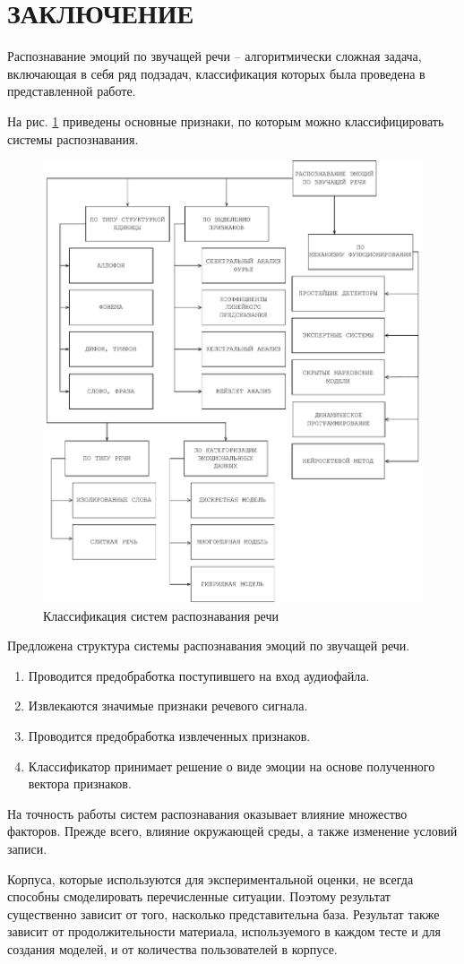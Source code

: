 \part*{ЗАКЛЮЧЕНИЕ}

Распознавание эмоций по звучащей речи -- алгоритмически сложная задача, включающая в себя ряд подзадач, классификация которых была проведена в представленной работе.

На рис. \ref{fig:classification} приведены основные признаки, по которым можно классифицировать системы распознавания.

\begin{figure}[H]
	\centering
	\includegraphics[width=0.85\linewidth]{assets/class}
	\caption{Классификация систем распознавания речи}
	\label{fig:classification}
\end{figure}


Предложена структура системы распознавания эмоций по звучащей речи. 
\begin{enumerate}
	\item Проводится предобработка поступившего на вход аудиофайла.
	\item Извлекаются значимые признаки речевого сигнала.
	\item Проводится предобработка извлеченных признаков. 
	\item Классификатор принимает решение о виде эмоции на основе полученного вектора признаков.
\end{enumerate}

На точность работы систем распознавания оказывает влияние множество факторов. Прежде всего, влияние окружающей среды, а также изменение условий записи.

Корпуса, которые используются для экспериментальной оценки, не всегда способны смоделировать перечисленные ситуации. Поэтому результат существенно зависит от того, насколько представительна база. Результат также зависит от продолжительности материала, используемого в каждом тесте и для создания моделей, и от количества пользователей в корпусе.